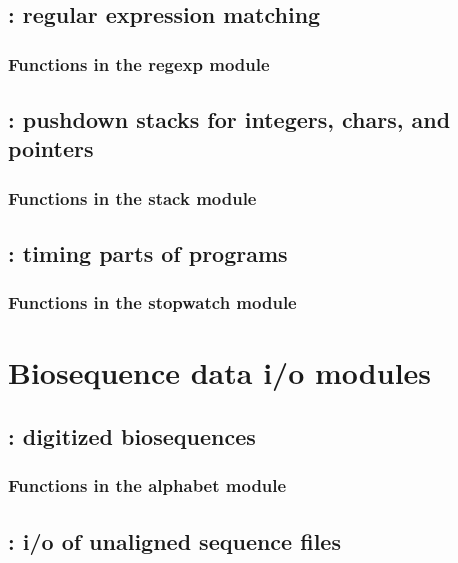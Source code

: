\documentclass[10pt]{book}
\begin{document}
\newpage
\section{: regular expression matching}

\subsection{Functions in the regexp module}


\newpage
\section{: pushdown stacks for integers, chars, and pointers}

\subsection{Functions in the stack module}


\newpage
\section{: timing parts of programs}

\subsection{Functions in the stopwatch module}



\chapter{Biosequence data i/o modules}

\newpage
\section{: digitized biosequences}

\subsection{Functions in the alphabet module}


\newpage
\section{: i/o of unaligned sequence files}

\end{document}

